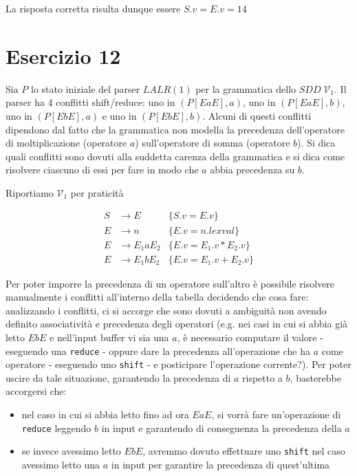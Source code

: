 \documentclass[class=book, crop=false, oneside, 12pt]{standalone}
\begin{document}
La risposta corretta risulta dunque essere \(S.v = E.v = 14\)

\section*{Esercizio 12}

Sia \(P\) lo  stato  iniziale  del  parser  \(LALR(1)\)  per  la  grammatica  dello  \(SDD \; \mathcal{V}_1\). Il parser ha 4  conflitti shift/reduce:  uno in \((P[EaE],a)\), uno in \((P[EaE],b)\), uno in \((P[EbE],a)\) e uno in \((P[EbE],b)\).   Alcuni di  questi  conflitti  dipendono  dal  fatto  che  la  grammatica  non  modella  la  precedenza  dell'operatore  di moltiplicazione (operatore \(a\)) sull'operatore di somma (operatore \(b\)).  Si dica quali conflitti sono dovuti alla suddetta carenza della grammatica e si dica come risolvere ciascuno di essi per fare in modo che \(a\) abbia precedenza su \(b\).

Riportiamo \(\mathcal{V}_1\) per praticità

\begin{align*}
    S &\to E &\{S.v = E.v\} \\
    E &\to n &\{E.v = n.lexval\} \\
    E &\to E_1 a E_2 &\{E.v = E_1.v * E_2.v\} \\
    E &\to E_1 b E_2 &\{E.v = E_1.v + E_2.v\} 
\end{align*}

Per poter imporre la precedenza di un operatore sull'altro è possibile risolvere manualmente i conflitti all'interno della tabella decidendo che cosa fare: analizzando i conflitti, ci si accorge che sono dovuti a ambiguità non avendo definito associatività e precedenza degli operatori (e.g. nei casi in cui si abbia già letto \(EbE\) e nell'input buffer vi sia una \(a\), è necessario computare il valore - eseguendo una \texttt{reduce} - oppure dare la precedenza all'operazione che ha \(a\) come operatore - eseguendo uno \texttt{shift} - e posticipare l'operazione corrente?). Per poter uscire da tale situazione, garantendo la precedenza di \(a\) rispetto a \(b\), basterebbe accorgersi che:

\begin{itemize}
    \item nel caso in cui si abbia letto fino ad ora \(EaE\), si vorrà fare un'operazione di \texttt{reduce} leggendo \(b\) in input e garantendo di conseguenza la precedenza della \(a\)
    \item se invece avessimo letto \(EbE\), avremmo dovuto effettuare uno \texttt{shift} nel caso avessimo letto una \(a\) in input per garantire la precedenza di quest'ultima
\end{itemize}
\end{document}
